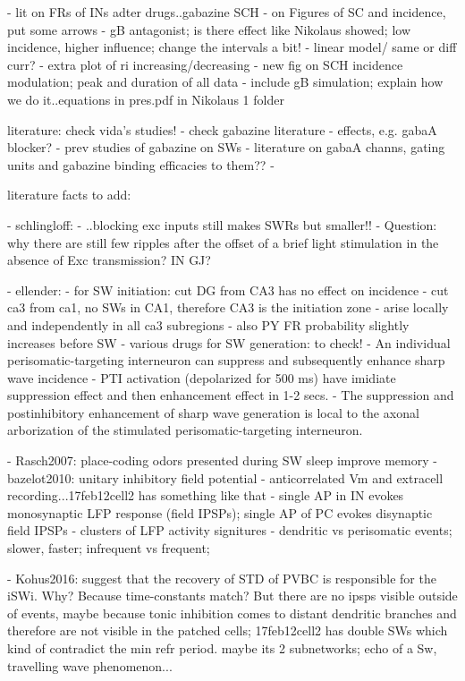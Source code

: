 - lit on FRs of INs adter drugs..gabazine SCH
- on Figures of SC and incidence, put some arrows
- gB antagonist; is there effect like Nikolaus showed; low incidence, higher influence; change the intervals a bit!
- linear model/ same or diff curr?
- extra plot of ri increasing/decreasing
- new fig on SCH incidence modulation; peak and duration of all data
- include gB simulation; explain how we do it..equations in pres.pdf in Nikolaus 1 folder


literature:
check vida's studies!
- check gabazine literature
  - effects, e.g. gabaA blocker?
  - prev studies of gabazine on SWs
  - literature on gabaA channs, gating units and gabazine binding efficacies to them??
  - 

literature facts to add:

- schlingloff:
    - ..blocking exc inputs still makes SWRs but smaller!!
    - Question: why there are still few ripples after the offset of a brief light stimulation in the absence of Exc transmission? IN GJ?

- ellender:
            - for SW initiation: cut DG from CA3 has no effect on incidence
            - cut ca3 from ca1, no SWs in CA1, therefore CA3 is the initiation zone
            - arise locally and independently in all ca3 subregions
            - also PY FR probability slightly increases before SW
            - various drugs for SW generation: to check!
            - An individual perisomatic-targeting interneuron can suppress and subsequently enhance sharp wave incidence
            - PTI activation (depolarized for 500 ms) have imidiate suppression effect and then enhancement effect in 1-2 secs.
            - The suppression and postinhibitory enhancement of sharp wave generation is local to the axonal arborization of the stimulated perisomatic-targeting interneuron.

- Rasch2007: place-coding odors presented during SW sleep improve memory
- bazelot2010: unitary inhibitory field potential
            - anticorrelated Vm and extracell recording...17feb12cell2  has something like that 
            - single AP in IN evokes monosynaptic LFP response (field IPSPs); single AP of PC evokes disynaptic field IPSPs
            - clusters of LFP activity signitures
            - dendritic vs perisomatic events; slower, faster; infrequent vs frequent; 

- Kohus2016: suggest that the recovery of STD of PVBC is responsible for the iSWi. Why? Because time-constants match? But there are no ipsps visible outside of events, maybe because tonic inhibition comes to distant dendritic branches and therefore are not visible in the patched cells; 17feb12cell2 has double SWs which kind of contradict the min refr period. maybe its 2 subnetworks; echo of a Sw, travelling wave phenomenon...

